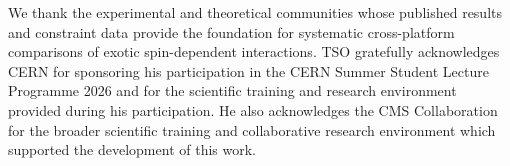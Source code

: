 \documentclass[aps,prd,reprint,superscriptaddress,nofootinbib]{revtex4-2}
\begin{document}
	We thank the experimental and theoretical communities whose published
	results and constraint data provide the foundation for systematic
	cross-platform comparisons of exotic spin-dependent interactions.
	TSO gratefully acknowledges CERN for sponsoring his participation in
	the CERN Summer Student Lecture Programme 2026 and for the scientific
	training and research environment provided during his participation.
	He also acknowledges the CMS Collaboration for the broader scientific
	training and collaborative research environment which supported the development of this work.
	
	
	
	
	
\end{document}
